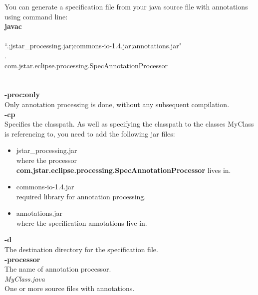 \documentclass{article}
\begin{document}
You can generate a specification file from your java source file with annotations using command line:\\
{\bf javac}\\
\hspace*{20 pt}{\bf-proc:only} \\
\hspace*{20 pt}{\bf -cp} ``.;jstar\_processing.jar;commons-io-1.4.jar;annotations.jar" \\
\hspace*{20 pt}{\bf -d} . \\
\hspace*{20 pt}{\bf -processor} com.jstar.eclipse.processing.SpecAnnotationProcessor \\
\hspace*{20 pt}{\it MyClass.java}\\\\
{\bf -proc:only }\\
\hspace*{20pt} Only annotation processing is done, without any subsequent compilation.\\
{\bf -cp}\\
\hspace*{20pt} Specifies the classpath. As well as specifying the classpath to the classes MyClass is referencing to, you need to add the following jar files:
\begin{itemize}
\item jstar\_processing.jar \\ where the processor {\bf com.jstar.eclipse.processing.SpecAnnotationProcessor} lives in.
\item commons-io-1.4.jar \\ required library for annotation processing.
\item annotations.jar \\ where the specification annotations live in.
\end{itemize}
{\bf -d} \\ 
\hspace*{20 pt}The destination directory for the specification file.\\
{\bf -processor}\\
\hspace*{20 pt}The name of annotation processor. \\
{\it MyClass.java}\\
\hspace*{20 pt} One or more source files with annotations.
\end{document}
